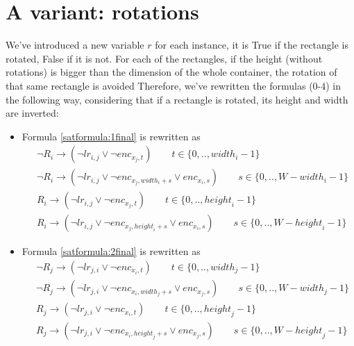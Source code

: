 \section{A variant: rotations}
We've introduced a new variable $r$ for each instance, it is True if the rectangle is rotated, False if it is not. For each of the rectangles, if the height (without rotations) is bigger than the dimension of the whole container, the rotation of that same rectangle is avoided 
\newline
Therefore, we've rewritten the formulas (0-4) in the following way, considering that if a rectangle is rotated, its height and width are inverted:
\begin{itemize}
    \item Formula \ref{satformula:1final} is rewritten as
        \begin{equation*}
        \begin{aligned}
        &\neg R_i \rightarrow (\neg lr_{i,j} \vee \neg {enc}_{x_{j},t}) \qquad t \in \{ 0,.., {width}_i -1\}
        \\
        &\neg R_i \rightarrow (\neg lr_{i,j} \vee \neg {enc}_{x_{j},{width}_i+s} \vee {enc}_{x_{i},s}) \qquad s \in \{ 0,.., W-{width}_i-1\}
        \\
        &R_i \rightarrow (\neg lr_{i,j} \vee \neg {enc}_{x_{j},t}) \qquad t \in \{ 0,.., {height}_i -1\}
        \\
        &R_i \rightarrow (\neg lr_{i,j} \vee \neg {enc}_{x_{j},{height}_i+s} \vee {enc}_{x_{i},s}) \qquad s \in \{ 0,.., W-{height}_i-1\}
        \end{aligned}
        \end{equation*}

    \item Formula \ref{satformula:2final} is rewritten as
        \begin{equation*}
        \begin{aligned}
        &\neg R_j \rightarrow (\neg lr_{j,i} \vee \neg {enc}_{x_{i},t}) \qquad t \in \{ 0,.., {width}_j -1\}
        \\
        &\neg R_j \rightarrow (\neg lr_{j,i} \vee \neg {enc}_{x_{i},{width}_j+s} \vee {enc}_{x_{j},s}) \qquad s \in \{ 0,.., W-{width}_j-1\}
        \\
        &R_j \rightarrow (\neg lr_{j,i} \vee \neg {enc}_{x_{i},t}) \qquad t \in \{ 0,.., {height}_j -1\}
        \\
        &R_j \rightarrow (\neg lr_{j,i} \vee \neg {enc}_{x_{i},{height}_j+s} \vee {enc}_{x_{j},s}) \qquad s \in \{ 0,.., W-{height}_j-1\}
        \end{aligned}
        \end{equation*}


\end{itemize}
